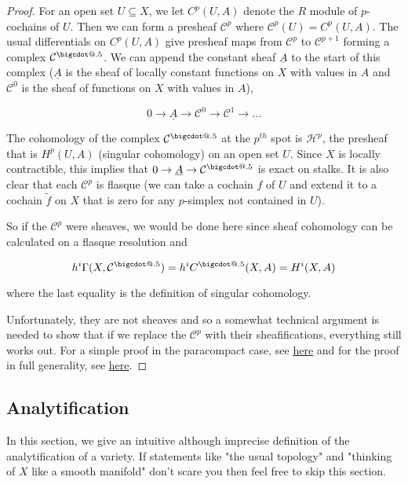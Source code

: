 \documentclass[a4paper]{article}
\makeatletter
\newcommand*\bigcdot{\mathpalette\bigcdot@{.5}}
\newcommand*\bigcdot@[2]{\mathbin{\vcenter{\hbox{\scalebox{#2}{$\m@th#1\bullet$}}}}}
\numberwithin{theorem}{section}
\numberwithin{equation}{section}
\makeatother
\begin{document}
\begin{proof}

For an open set $U \subseteq X$, we let $C^p(U,A)$ denote the $R$ module of $p$-cochains of $U$. Then we can form a presheaf $\mathcal{C}^p$ where $\mathcal{C}^p(U) = C^p(U,A)$. The usual differentials on $C^p(U,A)$ give presheaf maps from $\mathcal{C}^p$ to $\mathcal{C}^{p+1}$ forming a complex $\mathcal{C}^{\bigcdot}$. We can append the constant sheaf $\underline{A}$ to the start of this complex ($\underline{A}$ is the sheaf of locally constant functions on $X$ with values in $A$ and $\mathcal{C}^0$ is the sheaf of functions on $X$ with values in $A$),

$$ 0 \rightarrow \underline{A} \rightarrow \mathcal{C}^0 \rightarrow \mathcal{C}^1 \rightarrow \dots $$

The cohomology of the complex $\mathcal{C}^{\bigcdot}$ at the $p^{th}$ spot is $\mathcal{H}^p$, the presheaf that is $H^p(U,A)$ (singular cohomology) on an open set $U$. Since $X$ is locally contractible, this implies that $0 \rightarrow \underline{A} \rightarrow \mathcal{C}^{\bigcdot}$ is exact on stalks. It is also clear that each $\mathcal{C}^p$ is flasque (we can take a cochain $f$ of $U$ and extend it to a cochain $\tilde{f}$ on $X$ that is zero for any $p$-simplex not contained in $U$). 

So if the $\mathcal{C}^p$ were sheaves, we would be done here since sheaf cohomology can be calculated on a flasque resolution and

$$ h^i \Gamma(X,\mathcal{C}^{\bigcdot}) = h^i C^{\bigcdot}(X,A) = H^i(X,A) $$

where the last equality is the definition of singular cohomology.

Unfortunately, they are not sheaves and so a somewhat technical argument is needed to show that if we replace the $\mathcal{C}^p$ with their sheafifications, everything still works out. For a simple proof in the paracompact case, see \href{http://www-personal.umich.edu/~mmustata/SingSheafcoho.pdf}{here} and for the proof in full generality, see \href{https://arxiv.org/abs/1602.06674}{here}.

\end{proof}

\subsection{Analytification}
In this section, we give an intuitive although imprecise definition of the analytification of a variety. If statements like "the usual topology" and "thinking of $X$ like a smooth manifold" don't scare you then feel free to skip this section.
\end{document}
